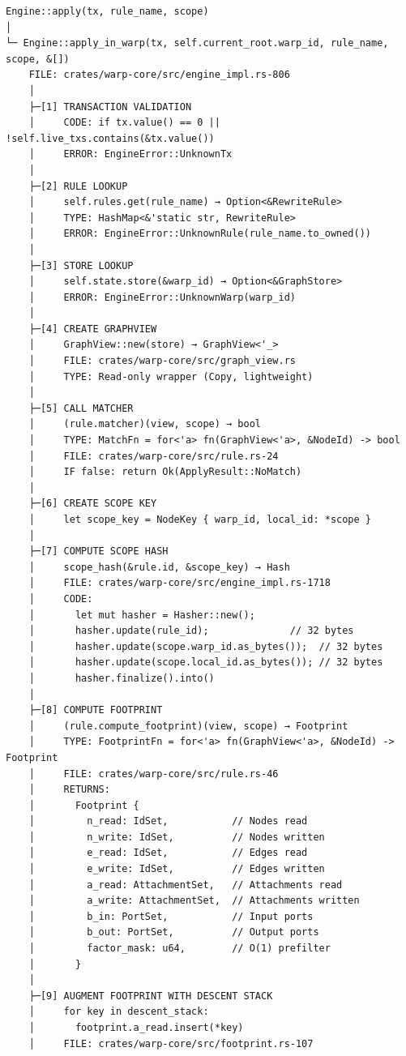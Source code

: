 \documentclass[11pt]{book}
\begin{document}
\begin{verbatim}
Engine::apply(tx, rule_name, scope)
│
└─ Engine::apply_in_warp(tx, self.current_root.warp_id, rule_name, scope, &[])
    FILE: crates/warp-core/src/engine_impl.rs-806
    │
    ├─[1] TRANSACTION VALIDATION
    │     CODE: if tx.value() == 0 || !self.live_txs.contains(&tx.value())
    │     ERROR: EngineError::UnknownTx
    │
    ├─[2] RULE LOOKUP
    │     self.rules.get(rule_name) → Option<&RewriteRule>
    │     TYPE: HashMap<&'static str, RewriteRule>
    │     ERROR: EngineError::UnknownRule(rule_name.to_owned())
    │
    ├─[3] STORE LOOKUP
    │     self.state.store(&warp_id) → Option<&GraphStore>
    │     ERROR: EngineError::UnknownWarp(warp_id)
    │
    ├─[4] CREATE GRAPHVIEW
    │     GraphView::new(store) → GraphView<'_>
    │     FILE: crates/warp-core/src/graph_view.rs
    │     TYPE: Read-only wrapper (Copy, lightweight)
    │
    ├─[5] CALL MATCHER
    │     (rule.matcher)(view, scope) → bool
    │     TYPE: MatchFn = for<'a> fn(GraphView<'a>, &NodeId) -> bool
    │     FILE: crates/warp-core/src/rule.rs-24
    │     IF false: return Ok(ApplyResult::NoMatch)
    │
    ├─[6] CREATE SCOPE KEY
    │     let scope_key = NodeKey { warp_id, local_id: *scope }
    │
    ├─[7] COMPUTE SCOPE HASH
    │     scope_hash(&rule.id, &scope_key) → Hash
    │     FILE: crates/warp-core/src/engine_impl.rs-1718
    │     CODE:
    │       let mut hasher = Hasher::new();
    │       hasher.update(rule_id);              // 32 bytes
    │       hasher.update(scope.warp_id.as_bytes());  // 32 bytes
    │       hasher.update(scope.local_id.as_bytes()); // 32 bytes
    │       hasher.finalize().into()
    │
    ├─[8] COMPUTE FOOTPRINT
    │     (rule.compute_footprint)(view, scope) → Footprint
    │     TYPE: FootprintFn = for<'a> fn(GraphView<'a>, &NodeId) -> Footprint
    │     FILE: crates/warp-core/src/rule.rs-46
    │     RETURNS:
    │       Footprint {
    │         n_read: IdSet,           // Nodes read
    │         n_write: IdSet,          // Nodes written
    │         e_read: IdSet,           // Edges read
    │         e_write: IdSet,          // Edges written
    │         a_read: AttachmentSet,   // Attachments read
    │         a_write: AttachmentSet,  // Attachments written
    │         b_in: PortSet,           // Input ports
    │         b_out: PortSet,          // Output ports
    │         factor_mask: u64,        // O(1) prefilter
    │       }
    │
    ├─[9] AUGMENT FOOTPRINT WITH DESCENT STACK
    │     for key in descent_stack:
    │       footprint.a_read.insert(*key)
    │     FILE: crates/warp-core/src/footprint.rs-107

\end{verbatim}
\end{document}
